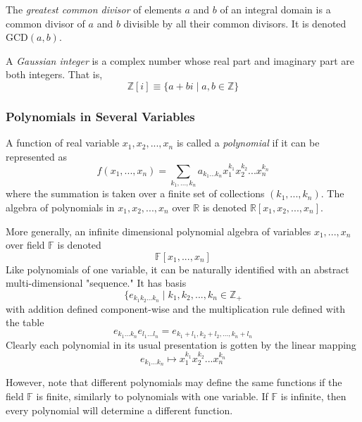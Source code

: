 \documentclass{article}
\begin{document}
      \begin{definition}
        The \textit{greatest common divisor} of elements $a$ and $b$ of an integral domain is a common divisor of $a$ and $b$ divisible by all their common divisors. It is denoted GCD$(a, b)$. 
      \end{definition}

      \begin{definition}
        A \textit{Gaussian integer} is a complex number whose real part and imaginary part are both integers. That is, 
        \[\mathbb{Z}[i] \equiv \{a + b i \;|\; a, b \in \mathbb{Z} \}\]
      \end{definition}

    \subsubsection{Polynomials in Several Variables}

      \begin{definition}
        A function of real variable $x_1, x_2, ..., x_n$ is called a \textit{polynomial} if it can be represented as 
        \[f(x_1, ..., x_n) =  \sum_{k_1, ..., k_n} a_{k_1 ... k_n} x_1^{k_1} x_2^{k_2} ... x_n^{k_n}\]
        where the summation is taken over a finite set of collections $(k_1, ..., k_n)$. The algebra of polynomials in $x_1, x_2, ..., x_n$ over $\mathbb{R}$ is denoted $\mathbb{R}[x_1, x_2, ..., x_n]$. 
      \end{definition}

      \begin{definition}
        More generally, an infinite dimensional polynomial algebra of variables $x_1, ..., x_n$ over field $\mathbb{F}$ is denoted
        \[\mathbb{F}[x_1, ..., x_n]\]
        Like polynomials of one variable, it can be naturally identified with an abstract multi-dimensional "sequence." It has basis 
        \[\{e_{k_1 k_2 ... k_n} \;|\; k_1, k_2, ..., k_n \in \mathbb{Z}_+\]
        with addition defined component-wise and the multiplication rule defined with the table
        \[e_{k_1...k_n} e_{l_1 ... l_n} = e_{k_1 + l_1, k_2 + l_2, ..., k_n + l_n}\]
        Clearly each polynomial in its usual presentation is gotten by the linear mapping
        \[e_{k_1 ... k_n} \mapsto x_1^{k_1} x_2^{k_2} ... x_n^{k_n}\]
      \end{definition}

      However, note that different polynomials may define the same functions if the field $\mathbb{F}$ is finite, similarly to polynomials with one variable. If $\mathbb{F}$ is infinite, then every polynomial will determine a different function. 
\end{document}

